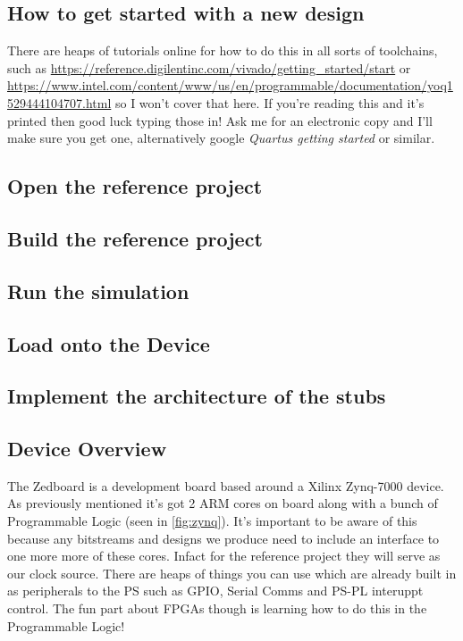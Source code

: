 \documentclass[11pt,a4paper]{article}
\begin{document}
\subsection{How to get started with a new design}
There are heaps of tutorials online for how to do this in all sorts of toolchains, such as \url{https://reference.digilentinc.com/vivado/getting_started/start} or \url{https://www.intel.com/content/www/us/en/programmable/documentation/yoq1529444104707.html} so I won't cover that here. If you're reading this and it's printed then good luck typing those in! Ask me for an electronic copy and I'll make sure you get one, alternatively google \emph{Quartus getting started} or similar.

\subsection{Open the reference project}

\subsection{Build the reference project}

\subsection{Run the simulation}

\subsection{Load onto the Device}

\subsection{Implement the architecture of the stubs}

\subsection{Device Overview}
The Zedboard is a development board based around a Xilinx Zynq-7000 device. As previously mentioned it's got 2 ARM cores on board along with a bunch of Programmable Logic (seen in \cref{fig:zynq}). It's important to be aware of this because any bitstreams and designs we produce need to include an interface to one more more of these cores. Infact for the reference project they will serve as our clock source. There are heaps of things you can use which are already built in as peripherals to the PS such as GPIO, Serial Comms and PS-PL interuppt control. The fun part about FPGAs though is learning how to do this in the Programmable Logic!
\end{document}
